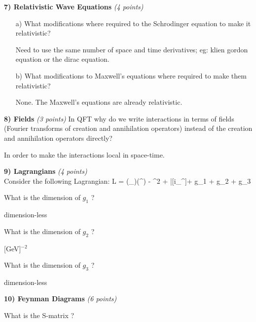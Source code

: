 {\vspace*{0.3in}
\textbf{7) Relativistic Wave Equations } \hfill \textit{(4 points)}\\

\begin{itemize}
\item[a)] What modifications where required to the Schrodinger equation to make it relativistic?

Need to use the same number of space and time derivatives; eg: klien gordon equation or the dirac equation.

\item[b)] What modifications to Maxwell's equations where required to make them relativistic?

None. The Maxwell's equations are already relativistic.

\end{itemize}

\vspace*{0.3in}
\textbf{8) Fields } \hfill \textit{(3 points)}
In QFT why do we write interactions in terms of fields (Fourier transforms of creation and annihilation operators)  instead  of the creation and annihilation operators directly?

In order to make the interactions local in space-time. 

\vspace*{0.3in}

\textbf{9) Lagrangians } \hfill \textit{(4 points)}\\
Consider the following Lagrangian:
\be
L =  (\partial_\mu\phi)(\partial^\mu\phi) - \phi^2 + \bar{\psi}[i\gamma_\mu\partial^\mu]\psi + g_1 \phi \psi \psi + g_2 \psi \psi \psi \psi + g_3 \phi \phi \phi \phi
\ee

\bi
\item[a)] What is the dimension of $g_1$ ? 

dimension-less

\item[b)] What is the dimension of $g_2$ ? 

[GeV]$^{-2}$

\item[c)] What is the dimension of $g_3$ ? 

dimension-less

\ei

\vspace*{0.3in}

\textbf{10) Feynman Diagrams }\hfill \textit{(6 points)}
\bi
\item[a)]What is the S-matrix ?

}
